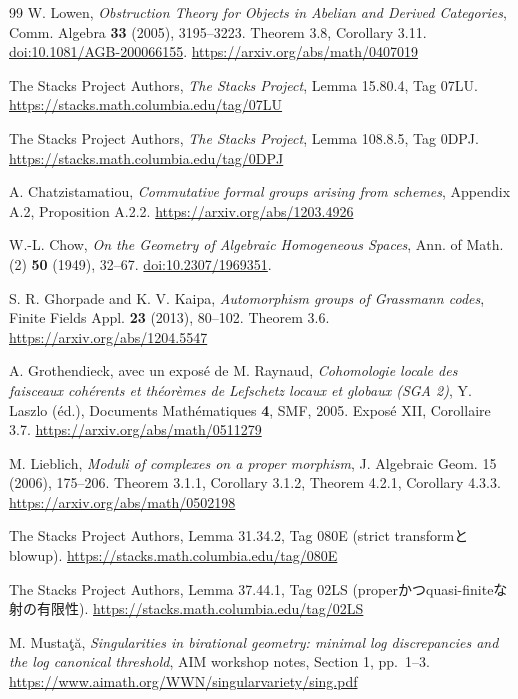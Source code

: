 \documentclass[a4paper,11pt]{ltjsarticle}
\theoremstyle{definition}
\begin{document}
\begin{thebibliography}{99}
W. Lowen,
\emph{Obstruction Theory for Objects in Abelian and Derived Categories},
Comm. Algebra \textbf{33} (2005), 3195--3223.
Theorem 3.8, Corollary 3.11.
\href{https://doi.org/10.1081/AGB-200066155}{doi:10.1081/AGB-200066155}.
\url{https://arxiv.org/abs/math/0407019}

The Stacks Project Authors,
\emph{The Stacks Project}, Lemma 15.80.4, Tag 07LU.
\url{https://stacks.math.columbia.edu/tag/07LU}

The Stacks Project Authors,
\emph{The Stacks Project}, Lemma 108.8.5, Tag 0DPJ.
\url{https://stacks.math.columbia.edu/tag/0DPJ}

A. Chatzistamatiou,
\emph{Commutative formal groups arising from schemes},
Appendix A.2, Proposition A.2.2.
\url{https://arxiv.org/abs/1203.4926}

W.-L. Chow,
\emph{On the Geometry of Algebraic Homogeneous Spaces},
Ann. of Math. (2) \textbf{50} (1949), 32--67.
\href{https://doi.org/10.2307/1969351}{doi:10.2307/1969351}.

S. R. Ghorpade and K. V. Kaipa,
\emph{Automorphism groups of Grassmann codes},
Finite Fields Appl. \textbf{23} (2013), 80--102.
Theorem 3.6.
\url{https://arxiv.org/abs/1204.5547}

A. Grothendieck, avec un expos\'e de M. Raynaud,
\emph{Cohomologie locale des faisceaux coh\'erents et th\'eor\`emes de Lefschetz
locaux et globaux (SGA 2)},
Y. Laszlo (\'ed.), Documents Math\'ematiques \textbf{4}, SMF, 2005.
Expos\'e XII, Corollaire 3.7.
\url{https://arxiv.org/abs/math/0511279}


M. Lieblich,
\emph{Moduli of complexes on a proper morphism},
J. Algebraic Geom. 15 (2006), 175--206.
Theorem 3.1.1, Corollary 3.1.2, Theorem 4.2.1, Corollary 4.3.3.
\url{https://arxiv.org/abs/math/0502198}

The Stacks Project Authors,
Lemma 31.34.2, Tag 080E (strict transformとblowup).
\url{https://stacks.math.columbia.edu/tag/080E}

The Stacks Project Authors,
Lemma 37.44.1, Tag 02LS (properかつquasi-finiteな射の有限性).
\url{https://stacks.math.columbia.edu/tag/02LS}

M. Musta\c{t}\u{a},
\emph{Singularities in birational geometry: minimal log discrepancies and the log canonical threshold},
AIM workshop notes, Section 1, pp.~1--3.
\url{https://www.aimath.org/WWN/singularvariety/sing.pdf}



\end{thebibliography}
\end{document}

